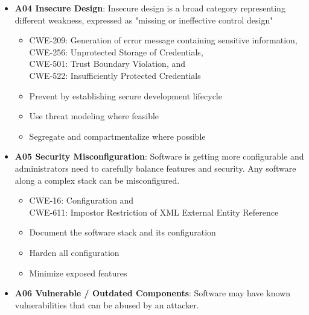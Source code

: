 \documentclass[11pt]{article}
\begin{document}
\begin{itemize}
		\begin{itemize}
			\item CWE-79: Cross-site Scripting, \\
			  CWE-89: SQL Injection, and \\ 
			  CWE-73: External Control of File Name or Path
			\item Reduce attack surface by shifting to safe API
			\item Sanitize user input through validation and escaping
			\item Validate input whenever possible
			\item Escape remaining characters when necessary
		\end{itemize}
	\item \textbf{A04 Insecure Design}: Insecure design is a broad category representing different weakness, expressed as "missing or ineffective control design"
		\begin{itemize}
			\item CWE-209: Generation of error message containing sensitive information, \\
			  CWE-256: Unprotected Storage of Credentials, \\
			  CWE-501: Trust Boundary Violation, and \\
			  CWE-522: Insufficiently Protected Credentials
			\item Prevent by establishing secure development lifecycle
			\item Use threat modeling where feasible
			\item Segregate and compartmentalize where possible
		\end{itemize}
	\item \textbf{A05 Security Misconfiguration}: Software is getting more configurable and administrators need to carefully balance features and security. Any software along a complex stack can be misconfigured.
		\begin{itemize}
			\item CWE-16: Configuration and \\
			  CWE-611: Impostor Restriction of XML External Entity Reference
			\item Document the software stack and its configuration
			\item Harden all configuration
			\item Minimize exposed features
		\end{itemize}
	\item \textbf{A06 Vulnerable / Outdated Components}: Software may have known vulnerabilities that can be abused by an attacker. 

\end{itemize}
\end{document}
